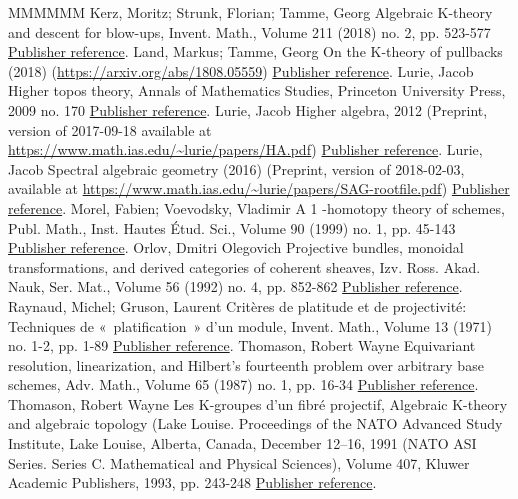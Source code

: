 \documentclass[11pt]{article}
\theoremstyle{definition}
\numberwithin{equation}{section}
\numberwithin{figure}{section}
\numberwithin{table}{section}
\begin{document}
\begin{thebibliography}{MMMMMM}
 Kerz, Moritz; Strunk, Florian; Tamme, Georg Algebraic K-theory and descent for blow-ups, Invent. Math., Volume 211 (2018) no. 2, pp. 523-577 \href{https://ahl.centre-mersenne.org/item/AHL_2020__3__1091_0/#KerzStrunkTamme}{Publisher reference}.
 Land, Markus; Tamme, Georg On the K-theory of pullbacks (2018) (\url{https://arxiv.org/abs/1808.05559}) \href{https://ahl.centre-mersenne.org/item/AHL_2020__3__1091_0/#LandTamme}{Publisher reference}.
 Lurie, Jacob Higher topos theory, Annals of Mathematics Studies, Princeton University Press, 2009 no. 170 \href{https://ahl.centre-mersenne.org/item/AHL_2020__3__1091_0/#HTT}{Publisher reference}.
 Lurie, Jacob Higher algebra, 2012 (Preprint, version of 2017-09-18 available at \url{https://www.math.ias.edu/~lurie/papers/HA.pdf}) \href{https://ahl.centre-mersenne.org/item/AHL_2020__3__1091_0/#HA-20170918}{Publisher reference}.
 Lurie, Jacob Spectral algebraic geometry (2016) (Preprint, version of 2018-02-03, available at \url{https://www.math.ias.edu/~lurie/papers/SAG-rootfile.pdf}) \href{https://ahl.centre-mersenne.org/item/AHL_2020__3__1091_0/#SAG-20180204}{Publisher reference}.
 Morel, Fabien; Voevodsky, Vladimir A 1 -homotopy theory of schemes, Publ. Math., Inst. Hautes Étud. Sci., Volume 90 (1999) no. 1, pp. 45-143 \href{https://ahl.centre-mersenne.org/item/AHL_2020__3__1091_0/#MorelVoevodsky}{Publisher reference}.
 Orlov, Dmitri Olegovich Projective bundles, monoidal transformations, and derived categories of coherent sheaves, Izv. Ross. Akad. Nauk, Ser. Mat., Volume 56 (1992) no. 4, pp. 852-862 \href{https://ahl.centre-mersenne.org/item/AHL_2020__3__1091_0/#OrlovSOD}{Publisher reference}.
 Raynaud, Michel; Gruson, Laurent Critères de platitude et de projectivité: Techniques de « platification »  d’un module, Invent. Math., Volume 13 (1971) no. 1-2, pp. 1-89 \href{https://ahl.centre-mersenne.org/item/AHL_2020__3__1091_0/#RaynaudGruson}{Publisher reference}.
 Thomason, Robert Wayne Equivariant resolution, linearization, and Hilbert’s fourteenth problem over arbitrary base schemes, Adv. Math., Volume 65 (1987) no. 1, pp. 16-34 \href{https://ahl.centre-mersenne.org/item/AHL_2020__3__1091_0/#ThomasonEquivariant}{Publisher reference}.
 Thomason, Robert Wayne Les K-groupes d’un fibré projectif, Algebraic K-theory and algebraic topology (Lake Louise. Proceedings of the NATO Advanced Study Institute, Lake Louise, Alberta, Canada, December 12–16, 1991 (NATO ASI Series. Series C. Mathematical and Physical Sciences), Volume 407, Kluwer Academic Publishers, 1993, pp. 243-248 \href{https://ahl.centre-mersenne.org/item/AHL_2020__3__1091_0/#ThomasonProjectiveBundle}{Publisher reference}.

\end{thebibliography}
\end{document}
